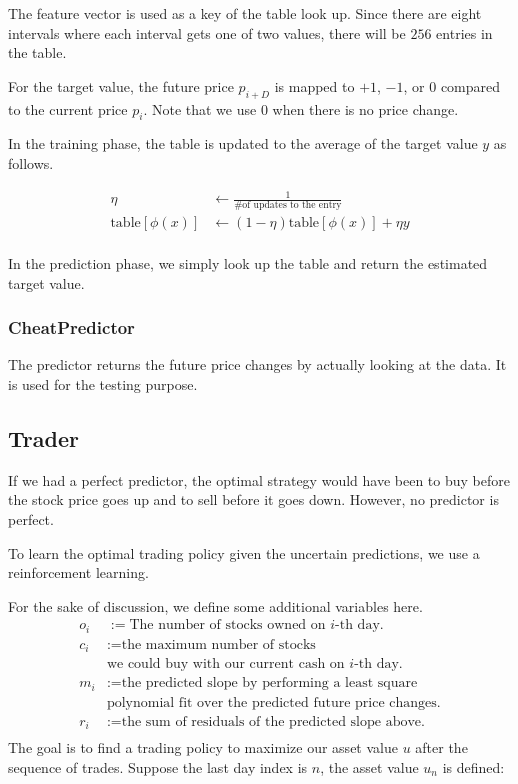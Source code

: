 \documentclass[twocolumn,10pt]{asme2ej}
\begin{document}
The feature vector is used as a key of the table look up. Since there
are eight intervals where each interval gets one of two values, there
will be $256$ entries in the table.

For the target value, the future price $p_{i+D}$ is mapped to $+1$,
$-1$, or $0$ compared to the current price $p_i$. Note that we use $0$
when there is no price change.

In the training phase, the table is updated to the average of the
target value $y$ as follows.

\begin{align*}
  \eta &\gets \frac{1}{\text{\# of updates to the entry}} \\
  \text{table}[\phi(x)] &\gets (1 - \eta)\text{table}[\phi(x)] + \eta y \\
\end{align*}

In the prediction phase, we simply look up the table and return the
estimated target value.

\subsubsection{CheatPredictor}

The predictor returns the future price changes by actually looking at the
data. It is used for the testing purpose.

\subsection{Trader}

If we had a perfect predictor, the optimal strategy would have been to
buy before the stock price goes up and to sell before it goes
down. However, no predictor is perfect.

To learn the optimal trading policy given the uncertain predictions,
we use a reinforcement learning.

For the sake of discussion, we define some additional variables here.
\begin{align*}
  o_i &:= \text{The number of stocks owned on }i\text{-th day.} \\
  c_i &:= \text{the maximum number of stocks}\\
  & \text{we could buy with our current cash on }i\text{-th day.} \\
  m_i &:= \text{the predicted slope by performing a least square} \\
  & \text{polynomial fit over the predicted future price changes.} \\
  r_i &:= \text{the sum of residuals of the predicted slope above.} \\
\end{align*}
The goal is to find a trading policy to maximize our asset value $u$
after the sequence of trades. Suppose the last day index is $n$, the
asset value $u_n$ is defined:
\end{document}
